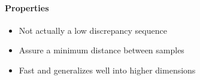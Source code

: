   \paragraph{Properties}
  \begin{itemize}
    \item Not actually a low discrepancy sequence
    \item Assure a minimum distance between samples
    \item Fast and generalizes well into higher dimensions
  \end{itemize}
